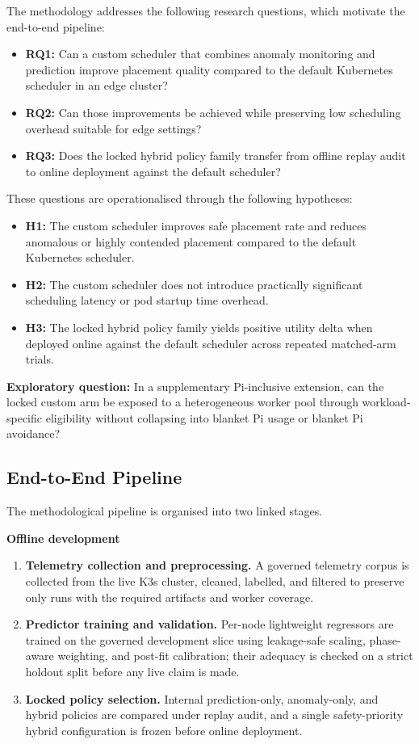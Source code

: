 The methodology addresses the following research questions, which motivate the end-to-end pipeline:

\begin{itemize}
\item \textbf{RQ1:} Can a custom scheduler that combines anomaly monitoring and prediction improve placement quality compared to the default Kubernetes scheduler in an edge cluster?
\item \textbf{RQ2:} Can those improvements be achieved while preserving low scheduling overhead suitable for edge settings?
\item \textbf{RQ3:} Does the locked hybrid policy family transfer from offline replay audit to online deployment against the default scheduler?
\end{itemize}

These questions are operationalised through the following hypotheses:

\begin{itemize}
\item \textbf{H1:} The custom scheduler improves safe placement rate and reduces anomalous or highly contended placement compared to the default Kubernetes scheduler.
\item \textbf{H2:} The custom scheduler does not introduce practically significant scheduling latency or pod startup time overhead.
\item \textbf{H3:} The locked hybrid policy family yields positive utility delta when deployed online against the default scheduler across repeated matched-arm trials.
\end{itemize}

\textbf{Exploratory question:} In a supplementary Pi-inclusive extension, can the locked custom arm be exposed to a heterogeneous worker pool through workload-specific eligibility without collapsing into blanket Pi usage or blanket Pi avoidance?

\subsection{End-to-End Pipeline}

The methodological pipeline is organised into two linked stages.

\textbf{Offline development}
\begin{enumerate}
\item \textbf{Telemetry collection and preprocessing.} A governed telemetry corpus is collected from the live K3s cluster, cleaned, labelled, and filtered to preserve only runs with the required artifacts and worker coverage.
\item \textbf{Predictor training and validation.} Per-node lightweight regressors are trained on the governed development slice using leakage-safe scaling, phase-aware weighting, and post-fit calibration; their adequacy is checked on a strict holdout split before any live claim is made.
\item \textbf{Locked policy selection.} Internal prediction-only, anomaly-only, and hybrid policies are compared under replay audit, and a single safety-priority hybrid configuration is frozen before online deployment.
\end{enumerate}

